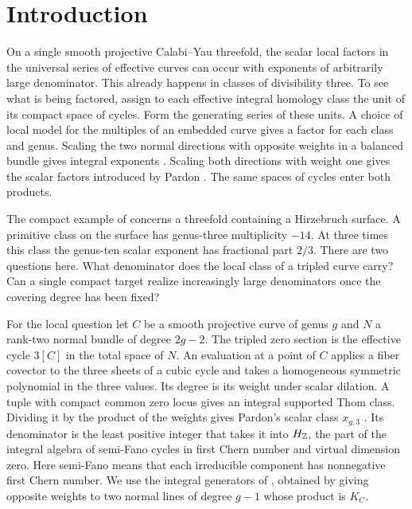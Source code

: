 \section{Introduction}

On a single smooth projective Calabi--Yau threefold, the scalar
local factors in the universal series of effective curves can occur
with exponents of arbitrarily large denominator. This already happens
in classes of divisibility three. To see what is being factored, assign
to each effective integral homology class the unit of its compact
space of cycles. Form the generating series of these units. A choice
of local model for the multiples of an embedded curve gives a factor
for each class and genus. Scaling the two normal directions with
opposite weights in a balanced bundle gives integral exponents
\cite{WueProduct,WueGenerators}. Scaling both directions with weight one gives
the scalar factors introduced by Pardon \cite{Pardon}.
The same spaces of cycles enter both products.

The compact example of \cite[Theorem~1.1]{WueCounter} concerns a
threefold containing a Hirzebruch surface. A primitive class on the surface has genus-three multiplicity
$-14$. At three times this class the genus-ten scalar exponent has
fractional part $2/3$. There are two
questions here. What denominator does the local class of a tripled
curve carry? Can a single compact target realize increasingly large
denominators once the covering degree has been fixed?

For the local question let $C$ be a smooth projective curve of genus
$g$ and $N$ a rank-two normal bundle of degree $2g-2$. The tripled zero
section is the effective cycle $3[C]$ in the total space of $N$.
An evaluation at a point of $C$ applies a fiber covector to the three
sheets of a cubic cycle and takes a homogeneous symmetric polynomial
in the three values. Its degree is its weight under scalar dilation.
A tuple with compact common zero locus gives an integral supported
Thom class. Dividing it by the product of the weights gives Pardon's
scalar class $x_{g,3}$ \cite[Definition~4.7]{Pardon}. Its denominator
is the least positive integer that takes it into $H_{\mathbb Z}$, the part
of the integral algebra of semi-Fano cycles in first Chern number and
virtual dimension zero. Here semi-Fano means that each irreducible
component has nonnegative first Chern number. We use the integral
generators of \cite[Theorem~1.1]{WueGenerators}, obtained by giving opposite
weights to two normal lines of degree $g-1$ whose product is $K_C$.

